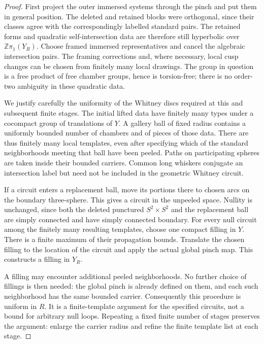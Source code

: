 \documentclass[11pt]{article}
\theoremstyle{definition}
\theoremstyle{remark}
\newcommand{\Z}{\mathbb Z}
\begin{document}
\begin{proof}
First project the outer immersed systems through the pinch and put them
in general position.  The deleted and retained blocks were orthogonal,
since their classes agree with the correspondingly labelled standard
pairs.  The retained forms and quadratic self-intersection data are
therefore still hyperbolic over $\Z\pi_1(Y_R)$.  Choose framed immersed
representatives and cancel the algebraic intersection pairs.  The
framing corrections and, where necessary, local cusp changes can be
chosen from finitely many local drawings.  The group in question is a
free product of free chamber groups, hence is torsion-free; there is no
order-two ambiguity in these quadratic data.

We justify carefully the uniformity of the Whitney discs required at
this and subsequent finite stages.  The initial lifted data have
finitely many types under a cocompact group of translations of $Y$.
A gallery ball of fixed radius contains a uniformly bounded number of
chambers and of pieces of those data.  There are thus finitely many
local templates, even after specifying which of the standard
neighborhoods meeting that ball have been peeled.  Paths on participating
spheres are taken inside their bounded carriers.  Common long whiskers
conjugate an intersection label but need not be included in the
geometric Whitney circuit.

If a circuit enters a replacement ball, move its portions there to
chosen arcs on the boundary three-sphere.  This gives a circuit in the
unpeeled space.  Nullity is unchanged, since both the deleted
punctured $S^2\times S^2$ and the replacement ball are simply connected
and have simply connected boundary.  For every null circuit among the
finitely many resulting templates, choose one compact filling in $Y$.
There is a finite maximum of their propagation bounds.  Translate the
chosen filling to the location of the circuit and apply the actual
global pinch map.  This constructs a filling in $Y_R$.

A filling may encounter additional peeled neighborhoods.  No further
choice of fillings is then needed: the global pinch is already defined
on them, and each such neighborhood has the same bounded carrier.
Consequently this procedure is uniform in $R$.  It is a finite-template
argument for the specified circuits, not a bound for arbitrary null
loops.  Repeating a fixed finite number of stages preserves the
argument: enlarge the carrier radius and refine the finite template
list at each stage.


\end{proof}
\end{document}
